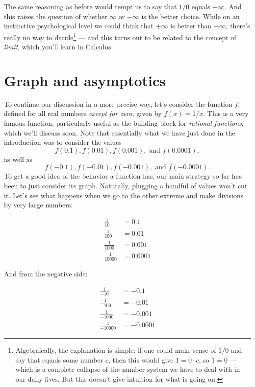 \documentclass{ximera}
\begin{document}
The same reasoning as before would tempt us to say that $1/0$ equals $-\infty$. And this raises the question of whether $\infty$ or $-\infty$ is the better choice. While on an instinctive psychological level we could think that $+\infty$ is better than $-\infty$, there's really no way to decide\footnote{Algebraically, the explanation is simple: if one could make sense of $1/0$ and say that equals some number $c$, then this would give $1 = 0 \cdot c$, so $1 = 0$ --- which is a complete collapse of the number system we have to deal with in our daily lives. But this doesn't give intuition for what is going on.} --- and this turns out to be related to the concept of \emph{limit}, which you'll learn in Calculus.

\section{Graph and asymptotics}

To continue our discussion in a more precise way, let's consider the function $f$, defined for all real numbers \emph{except for zero}, given by $f(x) = 1/x$. This is a very famous function, particularly useful as the building block for \emph{rational functions}, which we'll discuss soon. Note that essentially what we have just done in the introduction was to consider the values \[   f(0.1), f(0.01), f(0.001), \mbox{ and } f(0.0001),\]as well as \[f(-0.1), f(-0.01), f(-0.001), \mbox{ and } f(-0.0001).  \]
To get a good idea of the behavior a function has, our main strategy so far has been to just consider its graph. Naturally, plugging a handful of values won't cut it. Let's see what happens when we go to the other extreme and make divisions by very large numbers:

\begin{align*}
  \frac{1}{10} &= 0.1 \\ \frac{1}{100} &= 0.01 \\ \frac{1}{1000} &= 0.001 \\ \frac{1}{10000} &= 0.0001
\end{align*}

And from the negative side:

\begin{align*}
  \frac{1}{-10} &= -0.1 \\ \frac{1}{-100} &= -0.01 \\ \frac{1}{-1000} &= -0.001 \\ \frac{1}{-10000} &= -0.0001
\end{align*}
\end{document}
